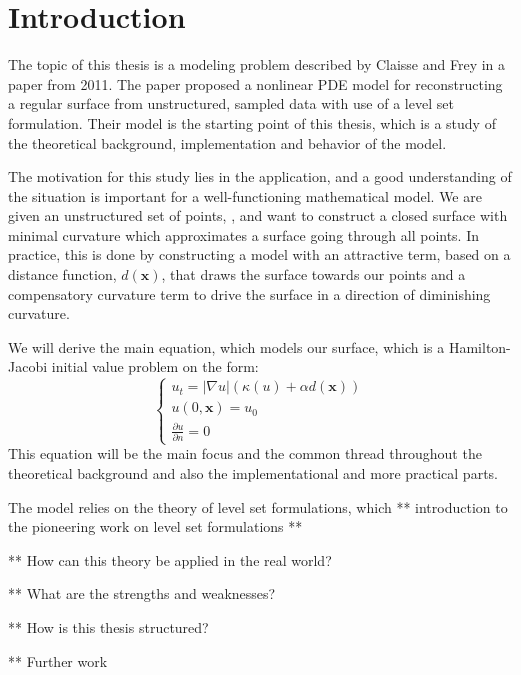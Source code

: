 \chapter{Introduction} \label{chap:introduction}
The topic of this thesis is a modeling problem described by Claisse and Frey in a paper from 2011\cite{Claisse-Frey}. The paper proposed a nonlinear PDE model for reconstructing a regular surface from unstructured, sampled data with use of a level set formulation. Their model is the starting point of this thesis, which is a study of the theoretical background, implementation and behavior of the model.

The motivation for this study lies in the application, and a good understanding of the situation is important for a well-functioning mathematical model. We are given an unstructured set of points, \pointset, and want to construct a closed surface with minimal curvature which approximates a surface going through all points. In practice, this is done by constructing a model with an attractive term, based on a distance function, $d(\mathbf{x})$, that draws the surface towards our points and a compensatory curvature term to drive the surface in a direction of diminishing curvature.

We will derive the main equation, which models our surface, which is a Hamilton-Jacobi initial value problem on the form:
\begin{equation}
    \begin{cases}
    u_t = |\nabla u|(\kappa (u) + \alpha d(\mathbf{x})) \\
    u(0, \mathbf{x}) = u_0 \\
    \frac{\partial u}{\partial n} = 0
    \end{cases}
    \label{eq:eq1-cf}
\end{equation}
This equation will be the main focus and the common thread throughout the theoretical background and also the implementational and more practical parts. 

The model relies on the theory of level set formulations, which ** introduction to the pioneering work on level set formulations **

** How can this theory be applied in the real world?

** What are the strengths and weaknesses?

** How is this thesis structured?

** Further work


